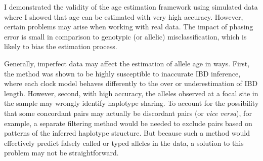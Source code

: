 I demonstrated the validity of the age estimation framework using simulated data where I showed that age can be estimated with very high accuracy.
However, certain problems may arise when working with real data.
The impact of phasing error is small in comparison to genotypic (or allelic) misclassification, which is likely to bias the estimation process.

Generally, imperfect data may affect the estimation of allele age in  ways.
First, the method was shown to be highly susceptible to inaccurate IBD inference, where each clock model behaves differently to the over or underestimation of IBD length.
However, second,  with high accuracy, the alleles observed at a focal site in the sample may wrongly identify haplotype sharing.
To account for the possibility that some concordant pairs may actually be discordant pairs (or \emph{vice versa}), for example, a separate filtering method would be needed to exclude pairs based on patterns of the inferred haplotype structure.
But because such a method would effectively predict falsely called or typed alleles in the data, a solution to this problem may not be straightforward.





